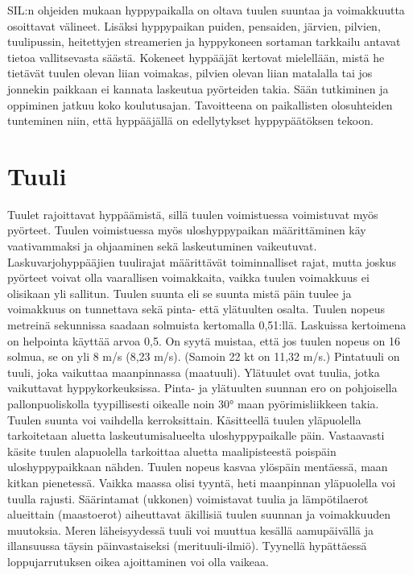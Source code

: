 
SIL:n ohjeiden mukaan hyppypaikalla on oltava tuulen suuntaa ja voimakkuutta osoittavat välineet. Lisäksi hyppypaikan puiden, pensaiden, järvien, pilvien, tuulipussin, heitettyjen streamerien ja hyppykoneen sortaman tarkkailu antavat tietoa vallitsevasta säästä. Kokeneet hyppääjät kertovat mielellään, mistä he tietävät tuulen olevan liian voimakas, pilvien olevan liian matalalla tai jos jonnekin paikkaan ei kannata laskeutua pyörteiden takia. Sään tutkiminen ja oppiminen jatkuu koko koulutusajan. Tavoitteena on paikallisten olosuhteiden tunteminen niin, että hyppääjällä on edellytykset hyppypäätöksen tekoon. 

\section{Tuuli}
\label{saaoppi-tuuli}


Tuulet rajoittavat hyppäämistä, sillä tuulen voimistuessa voimistuvat myös pyörteet. Tuulen voimistuessa myös uloshyppypaikan määrittäminen käy vaativammaksi ja ohjaaminen sekä laskeutuminen vaikeutuvat. Laskuvarjohyppääjien tuulirajat määrittävät toiminnalliset rajat, mutta joskus pyörteet voivat olla vaarallisen voimakkaita, vaikka tuulen voimakkuus ei olisikaan yli sallitun. Tuulen suunta eli se suunta mistä päin tuulee ja voimakkuus on tunnettava sekä pinta- että ylätuulten osalta. Tuulen nopeus metreinä sekunnissa saadaan solmuista kertomalla 0,51:llä. Laskuissa kertoimena on helpointa käyttää arvoa 0,5. On syytä muistaa, että jos tuulen nopeus on 16 solmua, se on yli 8 m/s (8,23 m/s). (Samoin 22 kt on 11,32 m/s.) Pintatuuli on tuuli, joka vaikuttaa maanpinnassa (maatuuli). Ylätuulet ovat tuulia, jotka vaikuttavat hyppykorkeuksissa. Pinta- ja ylätuulten suunnan ero on pohjoisella pallonpuoliskolla tyypillisesti oikealle noin 30° maan pyörimisliikkeen takia. Tuulen suunta voi vaihdella kerroksittain. Käsitteellä tuulen yläpuolella tarkoitetaan aluetta laskeutumisalueelta uloshyppypaikalle päin. Vastaavasti käsite tuulen alapuolella tarkoittaa aluetta maalipisteestä poispäin uloshyppypaikkaan nähden. Tuulen nopeus kasvaa ylöspäin mentäessä, maan kitkan pienetessä. Vaikka maassa olisi tyyntä, heti maanpinnan yläpuolella voi tuulla rajusti. Säärintamat (ukkonen) voimistavat tuulia ja lämpötilaerot alueittain (maastoerot) aiheuttavat äkillisiä tuulen suunnan ja voimakkuuden muutoksia. Meren läheisyydessä tuuli voi muuttua kesällä aamupäivällä ja illansuussa täysin päinvastaiseksi (merituuli-ilmiö). Tyynellä hypättäessä loppujarrutuksen oikea ajoittaminen voi olla vaikeaa. 

